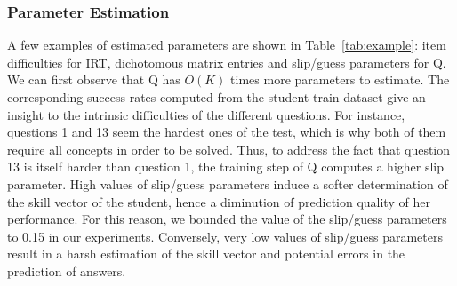 \documentclass{edm_template}
\begin{document}
\subsubsection{Parameter Estimation}

A few examples of estimated parameters are shown in Table~\ref{tab:example}: item difficulties for IRT, dichotomous matrix entries and slip/guess parameters for Q. We can first observe that Q has $O(K)$ times more parameters to estimate. The corresponding success rates computed from the student train dataset give an insight to the intrinsic difficulties of the different questions. For instance, questions 1 and 13 seem the hardest ones of the test, which is why both of them require all concepts in order to be solved. Thus, to address the fact that question 13 is itself harder than question 1, the training step of Q computes a higher slip parameter. High values of slip/guess parameters induce a softer determination of the skill vector of the student, hence a diminution of prediction quality of her performance. For this reason, we bounded the value of the slip/guess parameters to 0.15 in our experiments. Conversely, very low values of slip/guess parameters result in a harsh estimation of the skill vector and potential errors in the prediction of answers.
\end{document}
